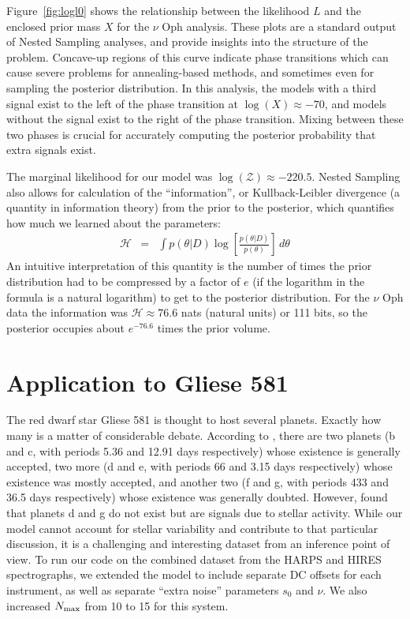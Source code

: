 \documentclass[useAMS,usenatbib]{mn2e}
\begin{document}
Figure~\ref{fig:logl0} shows the relationship between the likelihood $L$
and the enclosed prior mass $X$ for the $\nu$ Oph analysis. These plots are
a standard output of Nested Sampling analyses, and provide
insights into the structure of the problem. Concave-up regions of this curve
indicate phase transitions which can cause severe problems for annealing-based
methods, and sometimes even for sampling the posterior distribution. In this
analysis, the models with a third signal exist to the left of the phase
transition at $\log(X) \approx -70$, and models without the signal exist to the
right of the phase transition. Mixing between these two phases is crucial for
accurately computing the posterior probability that extra signals exist.

The marginal likelihood for our model was
$\log(\mathcal{Z}) \approx -220.5$. Nested Sampling also allows for calculation
of the ``information'', or Kullback-Leibler divergence (a quantity in information
theory) from the prior to the posterior, which quantifies how much we learned about the parameters:
\begin{eqnarray}
\mathcal{H} &=& \int p(\theta | D) \log\left[\frac{p(\theta | D)}{p(\theta)}\right] \, d\theta
\end{eqnarray}
An intuitive interpretation of this quantity is the number of times the
prior distribution had to be compressed by a factor of $e$ (if the logarithm
in the formula is a natural logarithm) to get to the posterior distribution.
For the $\nu$ Oph data the information was $\mathcal{H} \approx 76.6$ nats
(natural units) or 111 bits, so the posterior occupies about $e^{-76.6}$ times
the prior volume.

\section{Application to Gliese 581}
The red dwarf star Gliese 581 is thought to host several planets. Exactly
how many is a matter of considerable debate. According to
\citet{2014Sci...345..440R}, there are two planets
(b and c, with periods 5.36 and 12.91 days respectively)
whose existence is generally
accepted, two more
(d and e, with periods 66 and 3.15 days respectively)
whose existence was mostly accepted, and another two
(f and g, with periods 433 and 36.5 days respectively)
whose existence was generally doubted. However, \citet{2014Sci...345..440R}
found that planets d and g do not exist but are signals due to stellar activity.
While our model cannot account for stellar variability and contribute to that
particular discussion, it is a challenging and interesting dataset from an
inference point of view.
To run our code on the combined dataset from the HARPS and HIRES spectrographs,
we extended the model to include separate DC offsets for each instrument, as
well as separate ``extra noise'' parameters $s_0$ and $\nu$. We also increased
$N_{\rm max}$ from 10 to 15 for this system.
\end{document}
